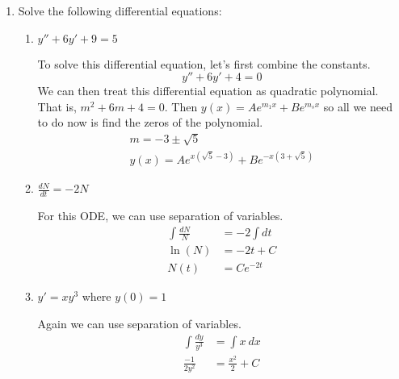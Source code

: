\begin{enumerate}
\begin{enumerate}[label = {Case \arabic*:}]
  \item
    When \(h > 0\).
    \par\smallskip
    Since \(h\) corresponds to \(y\), we need to determine the x associated
    with this \(y\) for the bounds of integration.
    \[
    h = \pm\sqrt{R^2 - x^2}\Rightarrow x = \pm\sqrt{R^2 - h^2}
    \]
    Then the exposed surface area is
    \begin{align*}
      SA &= 2\pi R\int_{-\sqrt{R^2 - h^2}}^{\sqrt{R^2 - h^2}} \ dx\\
         &= 4\pi R\sqrt{R^2 - h^2}\eqnumtag\label{saexp}
    \end{align*}
  \item
    When \(h < 0\).
    \par\smallskip
    For this case, it will be \(2\pi R^2\) plus \cref{saexp}.
  \end{enumerate}
\item
  Solve the following differential equations:
  \begin{enumerate}[label = (\alph*)]
  \item
    \(y'' + 6y' + 9 = 5\)
    \par\smallskip
    To solve this differential equation, let's first combine the constants.
    \[
    y'' + 6y' + 4 = 0
    \]
    We can then treat this differential equation as quadratic polynomial.
    That is, \(m^2 + 6m + 4 = 0\).
    Then \(y(x) = Ae^{m_1x} + Be^{m_sx}\) so all we need to do now is find the
    zeros of the polynomial.
    \begin{gather*}
      m = -3\pm\sqrt{5}\\
      y(x) = Ae^{x(\sqrt{5} - 3)} + Be^{-x(3 + \sqrt{5})}
    \end{gather*}
  \item
    \(\frac{dN}{dt} = -2N\)
    \par\smallskip
    For this ODE, we can use separation of variables.
    \begin{align*}
      \int\frac{dN}{N} &= -2\int dt\\
      \ln(N) &= -2t + C\\
      N(t) &= Ce^{-2t}
    \end{align*}
  \item
    \(y' = xy^3\) where \(y(0) = 1\)
    \par\smallskip
    Again we can use separation of variables.
    \begin{align*}
      \int\frac{dy}{y^3} &= \int x \ dx\\
      \frac{-1}{2y^2} &= \frac{x^2}{2} + C\\

\end{align*}
\end{enumerate}
\end{enumerate}
